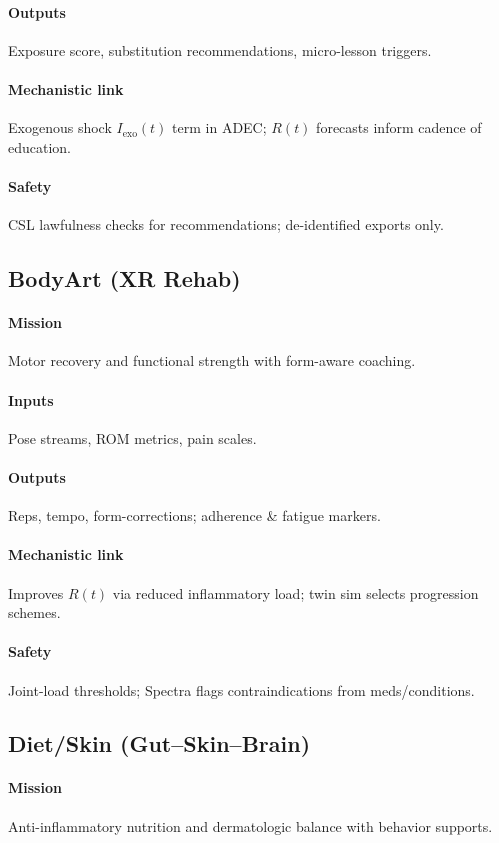 \documentclass[11pt]{article}
\theoremstyle{plain}
\begin{document}
\paragraph{Outputs} Exposure score, substitution recommendations, micro-lesson triggers.
\paragraph{Mechanistic link} Exogenous shock $I_{\mathrm{exo}}(t)$ term in ADEC; $R(t)$ forecasts inform cadence of education.
\paragraph{Safety} CSL lawfulness checks for recommendations; de-identified exports only.

\subsection{BodyArt (XR Rehab)}
\paragraph{Mission} Motor recovery and functional strength with form-aware coaching.
\paragraph{Inputs} Pose streams, ROM metrics, pain scales.
\paragraph{Outputs} Reps, tempo, form-corrections; adherence \& fatigue markers.
\paragraph{Mechanistic link} Improves $R(t)$ via reduced inflammatory load; twin sim selects progression schemes.
\paragraph{Safety} Joint-load thresholds; Spectra flags contraindications from meds/conditions.

\subsection{Diet/Skin (Gut–Skin–Brain)}
\paragraph{Mission} Anti-inflammatory nutrition and dermatologic balance with behavior supports.
\end{document}
